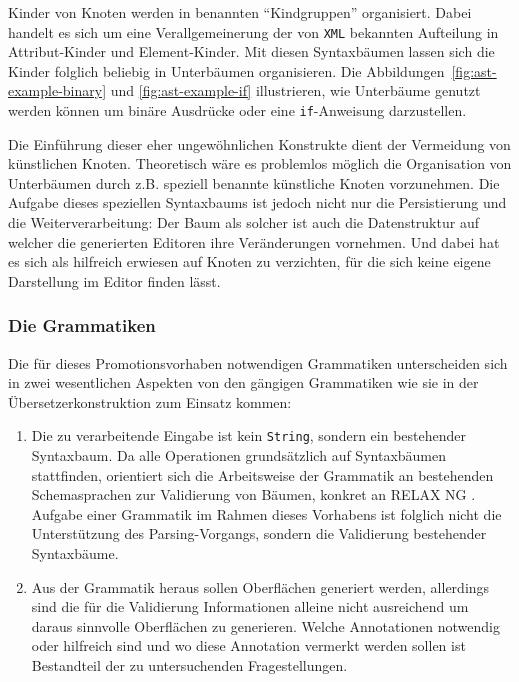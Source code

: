 \documentclass[paper=a4,fontsize=12pt,parskip=half]{scrartcl}
\begin{document}
Kinder von Knoten werden in benannten \enquote{Kindgruppen} organisiert. Dabei handelt es sich um eine Verallgemeinerung der von \texttt{XML} bekannten Aufteilung in Attribut-Kinder und Element-Kinder. Mit diesen Syntaxbäumen lassen sich die Kinder folglich beliebig in Unterbäumen organisieren. Die Abbildungen~\ref{fig:ast-example-binary} und \ref{fig:ast-example-if} illustrieren, wie Unterbäume genutzt werden können um binäre Ausdrücke oder eine \texttt{if}-Anweisung darzustellen.

Die Einführung dieser eher ungewöhnlichen Konstrukte dient der Vermeidung von künstlichen Knoten. Theoretisch wäre es problemlos möglich die Organisation von Unterbäumen durch z.B. speziell benannte künstliche Knoten vorzunehmen. Die Aufgabe dieses speziellen Syntaxbaums ist jedoch nicht nur die Persistierung und die Weiterverarbeitung: Der Baum als solcher ist auch die Datenstruktur auf welcher die generierten Editoren ihre Veränderungen vornehmen. Und dabei hat es sich als hilfreich erwiesen auf Knoten zu verzichten, für die sich keine eigene Darstellung im Editor finden lässt.

\subsubsection{Die Grammatiken}

Die für dieses Promotionsvorhaben notwendigen Grammatiken unterscheiden sich in zwei wesentlichen Aspekten von den gängigen Grammatiken wie sie in der Übersetzerkonstruktion zum Einsatz kommen:

\begin{enumerate}
\item Die zu verarbeitende Eingabe ist kein \texttt{String}, sondern ein bestehender Syntaxbaum. Da alle Operationen grundsätzlich auf Syntaxbäumen stattfinden, orientiert sich die Arbeitsweise der Grammatik an bestehenden Schemasprachen zur Validierung von Bäumen, konkret an RELAX NG \cite{clark_relax_2001}. Aufgabe einer Grammatik im Rahmen dieses Vorhabens ist folglich nicht die Unterstützung des Parsing-Vorgangs, sondern die Validierung bestehender Syntaxbäume.
\item Aus der Grammatik heraus sollen Oberflächen generiert werden, allerdings sind die für die Validierung Informationen alleine nicht ausreichend um daraus sinnvolle Oberflächen zu generieren. Welche Annotationen notwendig oder hilfreich sind und wo diese Annotation vermerkt werden sollen ist Bestandteil der zu untersuchenden Fragestellungen.
\end{enumerate}
\end{document}

